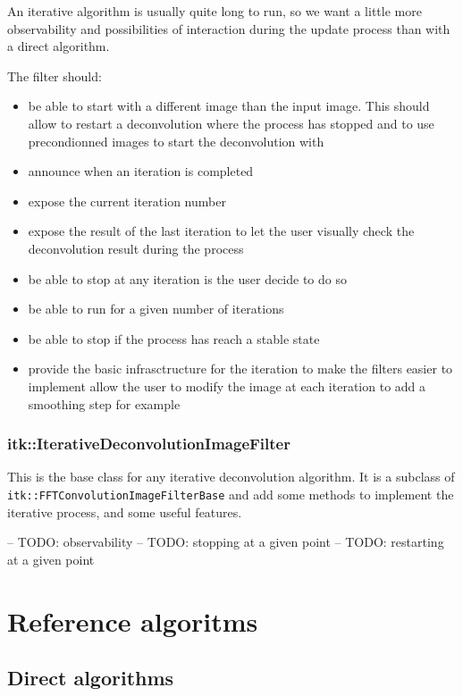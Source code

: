 \documentclass{InsightArticle}
\begin{document}
An iterative algorithm is usually quite long to run, so we want a little more observability and possibilities of interaction during the update
process than with a direct algorithm. 

The filter should:
\begin{itemize}
 \item be able to start with a different image than the input image. This should allow to restart a deconvolution where the process has stopped
       and to use precondionned images to start the deconvolution with
 \item announce when an iteration is completed
 \item expose the current iteration number
 \item expose the result of the last iteration to let the user visually check the deconvolution result during the process
 \item be able to stop at any iteration is the user decide to do so
 \item be able to run for a given number of iterations
 \item be able to stop if the process has reach a stable state
 \item provide the basic infrasctructure for the iteration to make the filters easier to implement
 \itme allow the user to modify the image at each iteration to add a smoothing step for example
\end{itemize}



\subsubsection{itk::IterativeDeconvolutionImageFilter}

This is the base class for any iterative deconvolution algorithm. It is a subclass of \verb$itk::FFTConvolutionImageFilterBase$ and add some methods
to implement the iterative process, and some useful features.


-- TODO: observability
-- TODO: stopping at a given point
-- TODO: restarting at a given point



\section{Reference algoritms}

\subsection{Direct algorithms}
\end{document}

